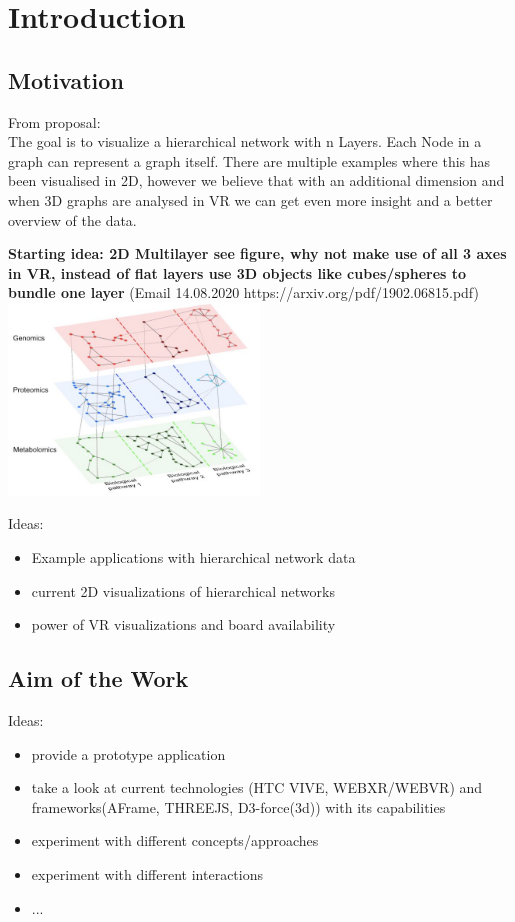 \chapter{Introduction}

\section{Motivation}
From proposal: \\
The	 goal	 is	 to	 visualize	 a	 hierarchical	 network	 with	 n	 Layers.	 Each	 Node	 in	 a	 graph	 can	
represent	a	graph	itself.	There	are	multiple	examples	where	this	has	been	visualised	in	2D,	
however	we	believe	that	with	an	additional	dimension	and	when	3D	graphs	are	analysed	in	
VR	we	can	get	even	more	insight	and	a	better	overview	of	the	data.	

\textbf{Starting idea: 2D Multilayer see figure, why not make use of all 3 axes in VR, instead of flat layers use 3D objects like cubes/spheres to bundle one layer} (Email 14.08.2020 https://arxiv.org/pdf/1902.06815.pdf)
\includegraphics[width=0.5\textwidth]{chapters/graphics/2dmultilayerVis.jpg}

Ideas:
\begin{itemize}
    \item Example applications with hierarchical network data
    \item current 2D visualizations of hierarchical networks
    \item power of VR visualizations and board availability
\end{itemize}

\section{Aim of the Work}

Ideas:
\begin{itemize}
    \item provide a prototype application
    \item take a look at current technologies (HTC VIVE, WEBXR/WEBVR) and frameworks(AFrame, THREEJS, D3-force(3d)) with its capabilities 
    \item experiment with different concepts/approaches
    \item experiment with different interactions
    \item ...
\end{itemize}

